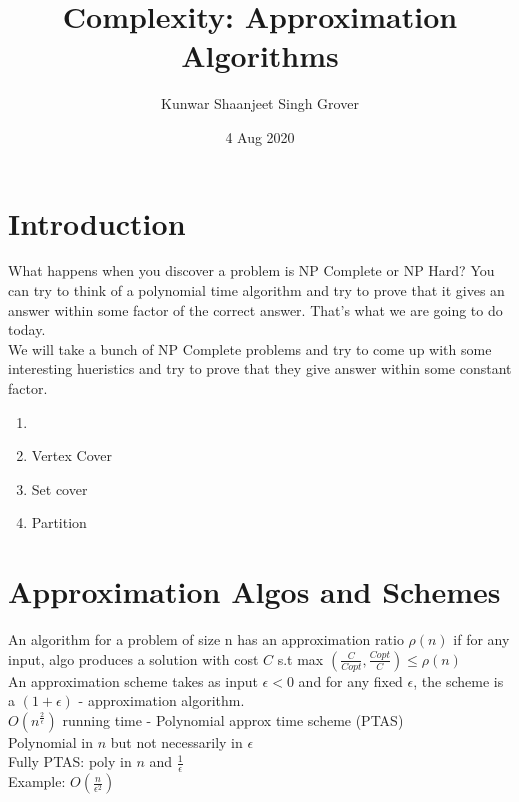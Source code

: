 \documentclass{article}
\title{Complexity: Approximation Algorithms}
\author{Kunwar Shaanjeet Singh Grover}
\date{4 Aug 2020}
\begin{document}
\maketitle
\newpage
{}

\section{Introduction}

What happens when you discover a problem is NP Complete or NP Hard? You can try
to think of a polynomial time algorithm and try to prove that it gives an answer
within some factor of the correct answer. That's what we are going to do today.\\

We will take a bunch of NP Complete problems and try to come up with some
interesting hueristics and try to prove that they give answer within some 
constant factor.

\begin{enumerate}
    
    \item  
    \item Vertex Cover
    \item Set cover
    \item Partition

\end{enumerate}

\section{Approximation Algos and Schemes}

An algorithm for a problem of size n has an approximation ratio $\rho(n)$ if 
for any input, algo produces a solution with cost $C$ s.t max $\left(\frac{C}{Copt}, \frac{Copt}{C}\right) \le \rho(n)$ \\

An approximation scheme takes as input $\epsilon < 0$ and for any fixed $\epsilon$, 
the scheme is a $(1 + \epsilon)$ - approximation algorithm. \\

$O(n^{\frac{2}{\epsilon}})$ running time - Polynomial approx time scheme (PTAS)\\
Polynomial in $n$ but not necessarily in $\epsilon$ \\

Fully PTAS: poly in $n$ and $\frac{1}{\epsilon}$ \\
Example: $O\left(\frac{n}{\epsilon^{2}}\right)$
\end{document}
